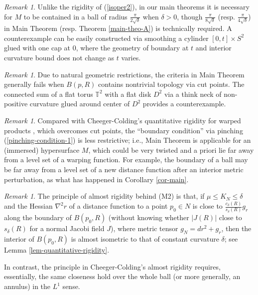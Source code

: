 \documentclass{amsart}
\numberwithin{equation}{section}
\theoremstyle{remark}
\newtheorem{rem}[theo]{Remark}
\renewcommand{\(}{\left(}
\renewcommand{\)}{\right)}
\renewcommand{\~}{\tilde}
\renewcommand{\-}{\overline}
\renewcommand{\d}{\delta}
\begin{document}
\begin{rem}\label{rem-CC-1}
	Unlike the rigidity of (\ref{isoper2}), in our main theorems it is necessary for $M$ to be contained in a ball of radius $\frac{\pi}{2\sqrt{\d}}$ when $\d>0$, though $\frac{\pi}{8\sqrt{\d}}$ (resp. $\frac{\pi}{4\sqrt{\d}}$) in Main Theorem (resp. Theorem \ref{main-theo-A}) is technically required. A counterexample can be easily constructed via smoothing a cylinder $[0,t]\times S^2$ glued with one cap at $0$, where the geometry of boundary at $t$ and interior curvature bound does not change as $t$ varies.
	
	
\end{rem} 	

\begin{rem}\label{rem-CC-2}
	Due to natural geometric restrictions, the criteria in Main Theorem generally fails when $B(p,R)$ contains nontrivial topology via cut points. The connected sum of a flat torus $\mathbb T^2$ with a flat disk $D^2$ via a think neck of non-positive curvature glued around center of $D^2$ provides a counterexample.
\end{rem}

\begin{rem}
	Compared with Cheeger-Colding's quantitative rigidity for warped products \cite{Cheeger-Colding1996},
	which overcomes cut points,	
	the ``boundary condition'' via pinching  (\ref{pinching-condition-1}) is less restrictive; i.e.,  Main Theorem is applicable for an (immersed) hypersurface $M$, which could be very twisted  and a priori lie far away from a level set of a warping function. For example, the boundary of a ball may be far away from a level set of a new distance function after an interior metric perturbation, as what has happened in Corollary \ref{cor-main}.
\end{rem}

\begin{rem}\label{rem-almost-rig}
	The principle of almost rigidity behind (M2) is that, if $\mu\le K_N\le \d$ and the Hessian $\nabla^2 r$ of a distance function to a point $p_0\in N$ is close to $\frac{c_\d(R)}{s_\d(R)}g_r$ along the boundary of $B(p_0,R)$ (without knowing whether $|J(R)|$ close to $s_\d(R)$ for a normal Jacobi field $J$), where metric tensor $g_N=dr^2+g_r$, then the interior of $B(p_0,R)$ is almost isometric to that of constant curvature $\d$; see Lemma \ref{lem-quantitative-rigidity}.
	
	In contrast, the principle in Cheeger-Colding's almost rigidity \cite{Cheeger-Colding1996} requires, essentially, the same closeness hold over the whole ball (or more generally, an annulus) in the $L^1$ sense.
\end{rem}
\end{document}
